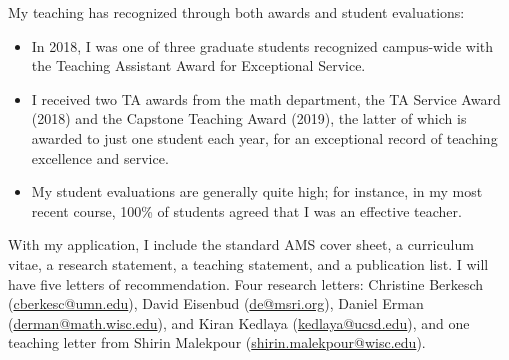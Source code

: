 \documentclass[11pt]{article}
\begin{document}
My teaching has recognized through both awards and student evaluations:
\begin{itemize}
\item In 2018, I was one of three graduate students recognized campus-wide with the Teaching Assistant Award for Exceptional Service.
\item I received two TA awards from the math department, the TA Service Award (2018) and the Capstone Teaching Award (2019), the latter of which is awarded to just one student each year, for an exceptional record of teaching excellence and service.
\item My student evaluations are generally quite high; for instance, in my most recent course, 100\% of students agreed that I was an effective teacher.
\end{itemize}
%
%
%

With my application, I include the standard AMS cover sheet, a curriculum vitae, a research statement, a teaching statement, and a publication list. I will have five letters of recommendation. Four research letters: Christine Berkesch (\href{mailto:cberkesc@umn.edu}{cberkesc@umn.edu}), David Eisenbud (\href{mailto:de@msri.org}{de@msri.org}), Daniel Erman (\href{mailto:derman@math.wisc.edu}{derman@math.wisc.edu}), and Kiran Kedlaya (\href{mailto:kedlaya@ucsb.edu}{kedlaya@ucsd.edu}), and one teaching letter from Shirin Malekpour (\href{mailto:shirin.malekpour@wisc.edu}{shirin.malekpour@wisc.edu}).
\end{document}
